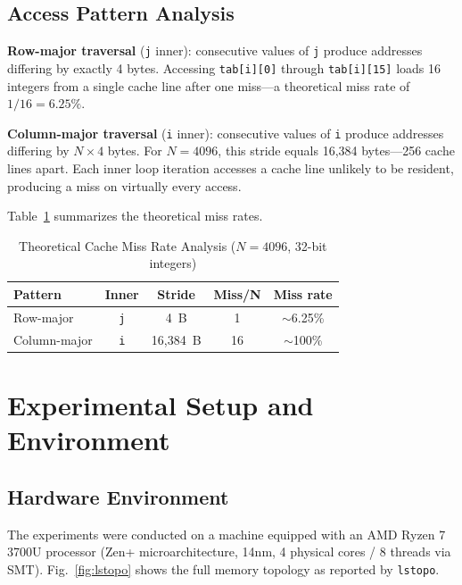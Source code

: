 \documentclass[conference]{IEEEtran}
\begin{document}
\subsection{Access Pattern Analysis}

\textbf{Row-major traversal} (\texttt{j} inner): consecutive values of
\texttt{j} produce addresses differing by exactly 4 bytes. Accessing
\texttt{tab[i][0]} through \texttt{tab[i][15]} loads 16 integers from a single
cache line after one miss---a theoretical miss rate of $1/16 = 6.25\%$.

\textbf{Column-major traversal} (\texttt{i} inner): consecutive values of
\texttt{i} produce addresses differing by $N \times 4$ bytes. For $N = 4096$,
this stride equals 16,384 bytes---256 cache lines apart. Each inner loop
iteration accesses a cache line unlikely to be resident, producing a miss on
virtually every access.

Table~\ref{tab:miss_theory} summarizes the theoretical miss rates.

\begin{table}[H]
\caption{Theoretical Cache Miss Rate Analysis ($N = 4096$, 32-bit integers)}
\label{tab:miss_theory}
\centering
\begin{tabular}{lcccc}
\toprule
\textbf{Pattern} & \textbf{Inner} & \textbf{Stride} &
\textbf{Miss/N} & \textbf{Miss rate} \\
\midrule
Row-major    & \texttt{j} & 4~B      & 1  & $\sim$6.25\% \\
Column-major & \texttt{i} & 16,384~B & 16 & $\sim$100\%  \\
\bottomrule
\end{tabular}
\end{table}

\section{Experimental Setup and Environment}
\label{sec:setup}

\subsection{Hardware Environment}

The experiments were conducted on a machine equipped with an AMD Ryzen 7 3700U
processor (Zen+ microarchitecture, 14nm, 4 physical cores / 8 threads via SMT).
Fig.~\ref{fig:lstopo} shows the full memory topology as reported by
\texttt{lstopo}.
\end{document}
